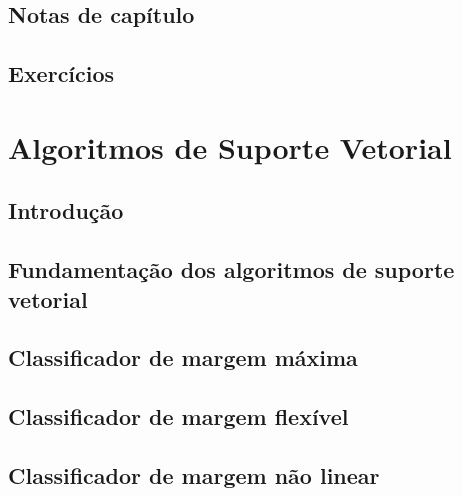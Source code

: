 \documentclass[
]{latex/krantz}
\theoremstyle{definition}
\theoremstyle{definition}
\theoremstyle{definition}
\theoremstyle{definition}
\theoremstyle{remark}
\begin{document}
\hypertarget{notas-de-capuxedtulo-7}{%
\section{Notas de capítulo}\label{notas-de-capuxedtulo-7}}

\hypertarget{exercuxedcios-7}{%
\section{Exercícios}\label{exercuxedcios-7}}

\hypertarget{algoritmos-de-suporte-vetorial}{%
\chapter{Algoritmos de Suporte Vetorial}\label{algoritmos-de-suporte-vetorial}}

\hypertarget{introduuxe7uxe3o-8}{%
\section{Introdução}\label{introduuxe7uxe3o-8}}

\hypertarget{fundamentauxe7uxe3o-dos-algoritmos-de-suporte-vetorial}{%
\section{Fundamentação dos algoritmos de suporte vetorial}\label{fundamentauxe7uxe3o-dos-algoritmos-de-suporte-vetorial}}

\hypertarget{classificador-de-margem-muxe1xima}{%
\section{Classificador de margem máxima}\label{classificador-de-margem-muxe1xima}}

\hypertarget{classificador-de-margem-flexuxedvel}{%
\section{Classificador de margem flexível}\label{classificador-de-margem-flexuxedvel}}

\hypertarget{classificador-de-margem-nuxe3o-linear}{%
\section{Classificador de margem não linear}\label{classificador-de-margem-nuxe3o-linear}}
\end{document}
